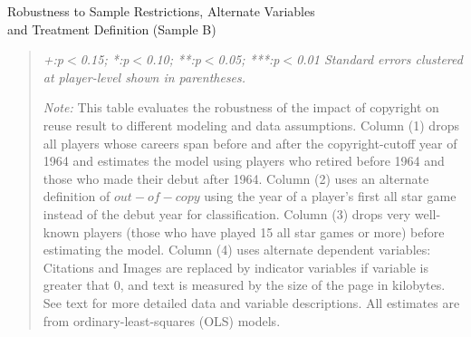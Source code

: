 \begin{center}
\begin{table}[!htbp]

\caption{Robustness to Sample Restrictions, Alternate Variables \\ and Treatment Definition (Sample B)}
\vspace{5mm}
\begin{adjustwidth}{.2cm}{.2cm}

%
\end{adjustwidth}

\begin{quote}
\vspace{5mm}

\emph{+:p$<$0.15; *:p$<$0.10; **:p$<$0.05; ***:p$<$0.01 
\newline
Standard errors clustered at player-level shown in parentheses.}
\vspace{5mm}

\emph{Note:} This table evaluates the robustness of the impact of copyright on reuse result to different modeling and data assumptions. Column (1) drops all players whose careers span before and after the copyright-cutoff year of 1964 and estimates the model using players who retired before 1964 and those who made their debut after 1964. Column (2) uses an alternate definition of $out-of-copy$ using the year of a player's first all star game instead of the debut year for classification. Column (3) drops very well-known players (those who have played 15 all star games or more) before estimating the model. Column (4) uses alternate dependent variables: Citations and Images are replaced by indicator variables if variable is greater that 0, and text is measured by the size of the page in kilobytes. See text for more detailed data and variable descriptions. All estimates are from ordinary-least-squares (OLS) models. 
\end{quote}
\label{tab:app_robust}
\end{table}
\end{center}


